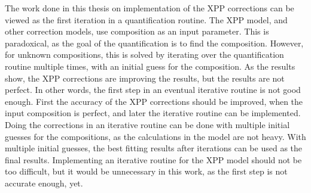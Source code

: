 The work done in this thesis on implementation of the XPP corrections can be viewed as the first iteration in a quantification routine.
The XPP model, and other correction models, use composition as an input parameter.
This is paradoxical, as the goal of the quantification is to find the composition.
However, for unknown compositions, this is solved by iterating over the quantification routine multiple times, with an initial guess for the composition.
As the results show, the XPP corrections are improving the results, but the results are not perfect.
In other words, the first step in an eventual iterative routine is not good enough.
First the accuracy of the XPP corrections should be improved, when the input composition is perfect, and later the iterative routine can be implemented.
Doing the corrections in an iterative routine can be done with multiple initial guesses for the compositions, as the calculations in the model are not heavy.
With multiple initial guesses, the best fitting results after iterations can be used as the final results.
Implementing an iterative routine for the XPP model should not be too difficult, but it would be unnecessary in this work, as the first step is not accurate enough, yet.

